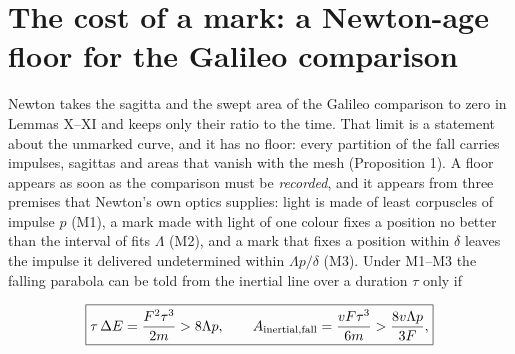 \documentclass[11pt,a4paper]{article}
\begin{document}
\hypertarget{the-cost-of-a-mark-a-newton-age-floor-for-the-galileo-comparison}{%
\section{The cost of a mark: a Newton-age floor for the Galileo
comparison}\label{the-cost-of-a-mark-a-newton-age-floor-for-the-galileo-comparison}}

Newton takes the sagitta and the swept area of the Galileo comparison to
zero in Lemmas X--XI and keeps only their ratio to the time. That limit
is a statement about the unmarked curve, and it has no floor: every
partition of the fall carries impulses, sagittas and areas that vanish
with the mesh (Proposition 1). A floor appears as soon as the comparison
must be \emph{recorded}, and it appears from three premises that
Newton's own optics supplies: light is made of least corpuscles of
impulse \(p\) (M1), a mark made with light of one colour fixes a
position no better than the interval of fits \(\Lambda\) (M2), and a
mark that fixes a position within \(\delta\) leaves the impulse it
delivered undetermined within \(\Lambda p/\delta\) (M3). Under M1--M3
the falling parabola can be told from the inertial line over a duration
\(\tau\) only if

\[\boxed{\tau\,\Delta E=\frac{F^2\tau^3}{2m}>8\Lambda p,\qquad
A_{\rm inertial,fall}=\frac{vF\tau^3}{6m}>\frac{8v\Lambda p}{3F},}\]
\end{document}
